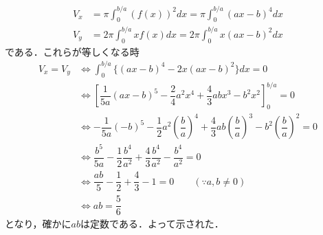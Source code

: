 \documentclass[../../main.tex]{subfiles}
\begin{document}
\begin{align}
  V_x &= \pi \int_0^{b/a} \left(f(x)\right)^2 dx = \pi \int_0^{b/a} (ax-b)^4 dx \\
  V_y &= 2\pi \int_0^{b/a} xf(x) dx = 2\pi \int_0^{b/a} x(ax-b)^2 dx
\end{align}
である．これらが等しくなる時
\begin{align}
  V_x = V_y
  &\iff \int_0^{b/a} \{ (ax-b)^4 - 2x(ax-b)^2 \} dx = 0 \\
  &\iff \left[ \dfrac{1}{5a} (ax-b)^5 - \dfrac{2}{4}a^2 x^4 + \dfrac{4}{3}ab x^3 - b^2 x^2 \right]_0^{b/a} = 0 \\
  &\iff -\dfrac{1}{5a} (-b)^5 - \dfrac{1}{2}a^2 \left(\dfrac{b}{a}\right)^4 + \dfrac{4}{3}ab \left(\dfrac{b}{a}\right)^3 - b^2 \left(\dfrac{b}{a}\right)^2 = 0 \\
  &\iff \dfrac{b^5}{5a} - \dfrac{1}{2}\dfrac{b^4}{a^2} + \dfrac{4}{3}\dfrac{b^4}{a^2} - \dfrac{b^4}{a^2} = 0 \\
  &\iff \dfrac{ab}{5} - \dfrac{1}{2} + \dfrac{4}{3} - 1 = 0 \qquad (\because a, b \neq 0) \\
  &\iff ab = \dfrac{5}{6}
\end{align}
となり，確かに$ab$は定数である．よって示された．

\newpage
\end{document}
